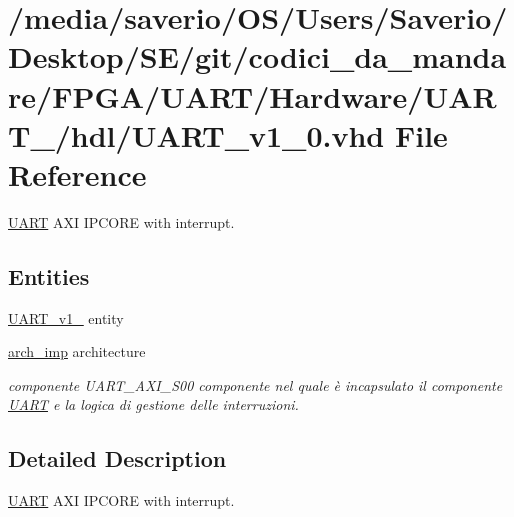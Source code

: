 \hypertarget{UART__v1__0_8vhd}{}\section{/media/saverio/\+O\+S/\+Users/\+Saverio/\+Desktop/\+S\+E/git/codici\+\_\+da\+\_\+mandare/\+F\+P\+G\+A/\+U\+A\+R\+T/\+Hardware/\+U\+A\+R\+T\+\_/hdl/\+U\+A\+R\+T\+\_\+v1\+\_\+0.vhd File Reference}
\label{UART__v1__0_8vhd}


\hyperlink{structUART}{U\+A\+RT} A\+XI I\+P\+C\+O\+RE with interrupt.  


\subsection*{Entities}
\begin{DoxyCompactItemize}
\item 
\hyperlink{classUART__v1__0}{U\+A\+R\+T\+\_\+v1\+\_} entity
\item 
\hyperlink{classUART__v1__0_1_1arch__imp}{arch\+\_\+imp} architecture
\begin{DoxyCompactList}\small\item\em componente U\+A\+R\+T\+\_\+\+A\+X\+I\+\_\+\+S00  componente nel quale è incapsulato il componente \hyperlink{structUART}{U\+A\+RT} e la logica di gestione delle interruzioni. \end{DoxyCompactList}\end{DoxyCompactItemize}


\subsection{Detailed Description}
\hyperlink{structUART}{U\+A\+RT} A\+XI I\+P\+C\+O\+RE with interrupt. 

